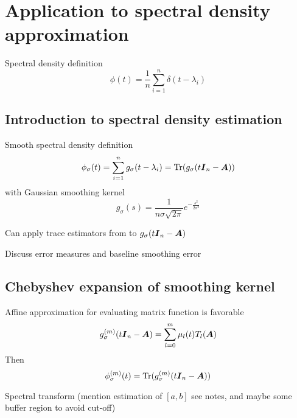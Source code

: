 \documentclass[12pt]{article}
\begin{document}
\section{Application to spectral density approximation}
\label{sec:application}

Spectral density definition
\begin{equation}
    \phi(t) = \frac{1}{n} \sum_{i=1}^{n} \delta(t - \lambda_i)
    \label{equ:spectral-density}
\end{equation}

\subsection{Introduction to spectral density estimation}
\label{subsec:spectral-density}

Smooth spectral density definition
\begin{equation}
    \phi_{\sigma}(t) = \sum_{i=1}^{n} g_{\sigma}(t - \lambda_i) = \operatorname{Tr}(g_{\sigma}(t\boldsymbol{I}_n - \boldsymbol{A}))
    \label{equ:smooth-spectral-density}
\end{equation}
with Gaussian smoothing kernel
\begin{equation}
    g_{\sigma}(s) = \frac{1}{n \sigma \sqrt{2\pi}} e^{-\frac{s^2}{2\sigma^2}}
    \label{equ:smoothing-kernel}
\end{equation}

Can apply trace estimators from  to $g_{\sigma}(t\boldsymbol{I}_n - \boldsymbol{A})$

Discuss error measures and baseline smoothing error 

\subsection{Chebyshev expansion of smoothing kernel}
\label{subsec:chebyshev-expansion}

Affine approximation for evaluating matrix function is favorable
\begin{equation}
    g_{\sigma}^{(m)}(t\boldsymbol{I}_n - \boldsymbol{A}) = \sum_{l=0}^{m} \mu_l(t) T_l(\boldsymbol{A})
    \label{equ:matrix-expansion}
\end{equation}
Then
\begin{equation}
    \phi_{\sigma}^{(m)}(t) = \operatorname{Tr}(g_{\sigma}^{(m)}(t \boldsymbol{I}_n - \boldsymbol{A}))
    \label{equ:expanded-spectral-density}
\end{equation}

Spectral transform (mention estimation of $[a,b]$ see notes, and maybe some buffer region to avoid cut-off)
\end{document}
